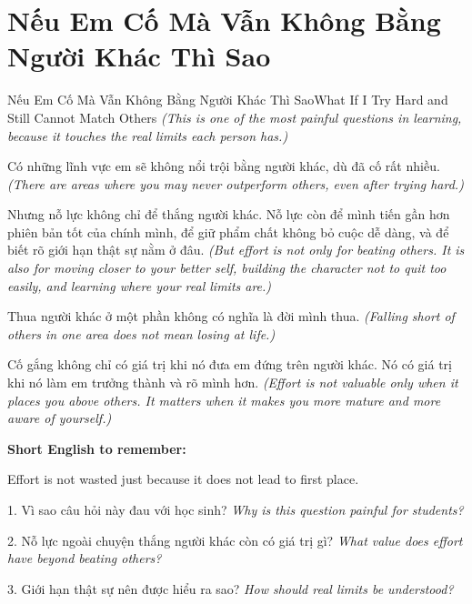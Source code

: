 \section{Nếu Em Cố Mà Vẫn Không Bằng Người Khác Thì Sao}
\begin{truyen}{Nếu Em Cố Mà Vẫn Không Bằng Người Khác Thì Sao}{What If I Try Hard and Still Cannot Match Others}
\textit{(This is one of the most painful questions in learning, because it touches the real limits each person has.)}

Có những lĩnh vực em sẽ không nổi trội bằng người khác, dù đã cố rất nhiều.
\textit{(There are areas where you may never outperform others, even after trying hard.)}

Nhưng nỗ lực không chỉ để thắng người khác. Nỗ lực còn để mình tiến gần hơn phiên bản tốt của chính mình, để giữ phẩm chất không bỏ cuộc dễ dàng, và để biết rõ giới hạn thật sự nằm ở đâu.
\textit{(But effort is not only for beating others. It is also for moving closer to your better self, building the character not to quit too easily, and learning where your real limits are.)}

Thua người khác ở một phần không có nghĩa là đời mình thua.
\textit{(Falling short of others in one area does not mean losing at life.)}
\end{truyen}

\begin{baihoc}
Cố gắng không chỉ có giá trị khi nó đưa em đứng trên người khác. Nó có giá trị khi nó làm em trưởng thành và rõ mình hơn.
\textit{(Effort is not valuable only when it places you above others. It matters when it makes you more mature and more aware of yourself.)}
\end{baihoc}

\begin{ghinhoanh}
\textbf{Short English to remember:}

Effort is not wasted just because it does not lead to first place.

\end{ghinhoanh}

\begin{tuhocnhanh}
1. Vì sao câu hỏi này đau với học sinh? \textit{Why is this question painful for students?}

2. Nỗ lực ngoài chuyện thắng người khác còn có giá trị gì? \textit{What value does effort have beyond beating others?}

3. Giới hạn thật sự nên được hiểu ra sao? \textit{How should real limits be understood?}
\end{tuhocnhanh}
\ngancach

